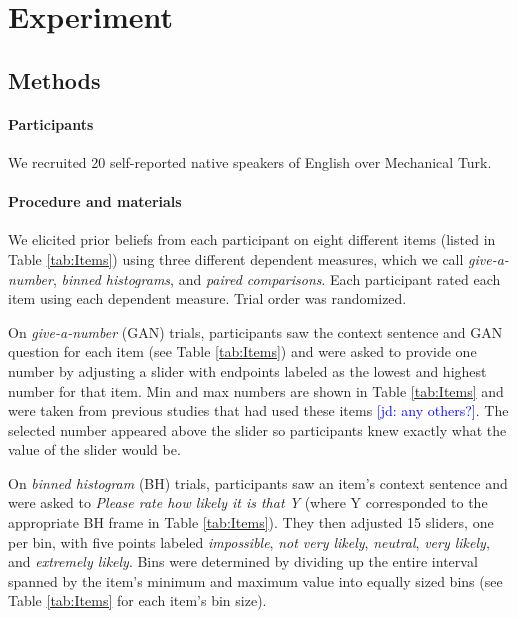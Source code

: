 \documentclass[10pt,letterpaper]{article}
\newcommand{\jd}[1]{\textcolor{Blue}{[jd: #1]}}
\newcommand{\tableref}[1]{Table \ref{#1}}
\begin{document}
\section{Experiment}

\subsection{Methods} 

\paragraph{Participants} We recruited 20 self-reported native speakers of English over Mechanical Turk.

\paragraph{Procedure and materials}

We elicited prior beliefs from each participant on eight different items (listed in \tableref{tab:Items}) using three different dependent measures, which we call \emph{give-a-number}, \emph{binned histograms}, and \emph{paired comparisons}. Each participant rated each item using each dependent measure. Trial order was randomized.

On  \emph{give-a-number} (GAN) trials, participants saw the context sentence and GAN question for each item (see \tableref{tab:Items}) and were asked to provide one number by adjusting a slider with endpoints labeled as the lowest and highest number for that item. Min and max numbers are shown in \tableref{tab:Items} and were taken from previous studies that had used these items \cite{DegenTessler2015:Wonky-worlds:-L,SchollerFranke2015:Semantic-values,KaoWu2014:Nonliteral-Unde}\jd{any others?}. The selected number appeared above the slider so participants knew exactly what the value of the slider would be. 

On \emph{binned histogram} (BH) trials, participants saw an item's context sentence and were asked to \emph{Please rate how likely it is that Y} (where Y corresponded to  the appropriate BH frame in \tableref{tab:Items}). They then adjusted 15 sliders, one per bin, with five points labeled \emph{impossible}, \emph{not very likely}, \emph{neutral}, \emph{very likely}, and \emph{extremely likely}. Bins were determined by dividing up the entire interval spanned by the item's minimum and maximum value into equally sized bins (see \tableref{tab:Items} for each item's bin size). 
\end{document}
